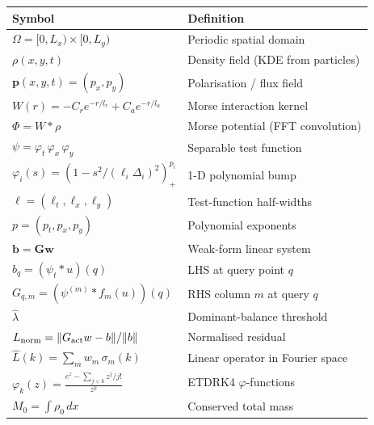 \documentclass[11pt]{article}
\newcommand{\bp}{\mathbf{p}}
\begin{document}
\begin{center}
\renewcommand{\arraystretch}{1.3}
\begin{tabular}{lp{8.5cm}}
\toprule
\textbf{Symbol} & \textbf{Definition} \\
\midrule
$\Omega = [0,L_x)\times[0,L_y)$ & Periodic spatial domain \\
$\rho(x,y,t)$ & Density field (KDE from particles) \\
$\bp(x,y,t) = (p_x, p_y)$ & Polarisation / flux field \\
$W(r) = -C_r e^{-r/l_r} + C_a e^{-r/l_a}$ & Morse interaction kernel \\
$\Phi = W * \rho$ & Morse potential (FFT convolution) \\
$\psi = \varphi_t\,\varphi_x\,\varphi_y$ & Separable test function \\
$\varphi_i(s) = (1 - s^2/(\ell_i\Delta_i)^2)_+^{p_i}$ & 1-D polynomial bump \\
$\ell = (\ell_t, \ell_x, \ell_y)$ & Test-function half-widths \\
$p = (p_t, p_x, p_y)$ & Polynomial exponents \\
$\mathbf{b} = \mathbf{G}\mathbf{w}$ & Weak-form linear system \\
$b_q = (\psi_t * u)(q)$ & LHS at query point $q$ \\
$G_{q,m} = (\psi^{(m)} * f_m(u))(q)$ & RHS column $m$ at query $q$ \\
$\hat{\lambda}$ & Dominant-balance threshold \\
$L_{\rm norm} = \|G_{\rm act} w - b\|/\|b\|$ & Normalised residual \\
$\hat{L}(k) = \sum_m w_m\,\sigma_m(k)$ & Linear operator in Fourier space \\
$\varphi_k(z) = \frac{e^z - \sum_{j<k} z^j/j!}{z^k}$ & ETDRK4 $\varphi$-functions \\
$M_0 = \int\rho_0\,dx$ & Conserved total mass \\
\bottomrule
\end{tabular}
\end{center}
\end{document}
